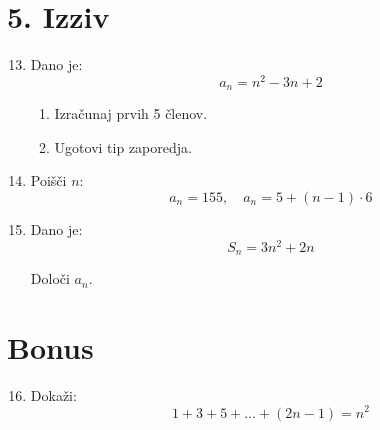 \documentclass[a4paper,12pt]{article}
\begin{document}
\section*{5. Izziv}

\begin{enumerate}
\setcounter{enumi}{12}

\item Dano je:
\[
a_n = n^2 - 3n + 2
\]

\begin{enumerate}
\item Izračunaj prvih 5 členov.
\vspace{1.5cm}
\item Ugotovi tip zaporedja.
\vspace{1.5cm}
\end{enumerate}

\item Poišči \( n \):
\[
a_n = 155, \quad a_n = 5 + (n-1)\cdot 6
\]
\vspace{2cm}

\item Dano je:
\[
S_n = 3n^2 + 2n
\]

Določi \( a_n \).
\vspace{2cm}

\end{enumerate}

\section*{Bonus}

\begin{enumerate}
\setcounter{enumi}{15}

\item Dokaži:
\[
1 + 3 + 5 + \dots + (2n-1) = n^2
\]
\vspace{3cm}

\end{enumerate}
\end{document}
